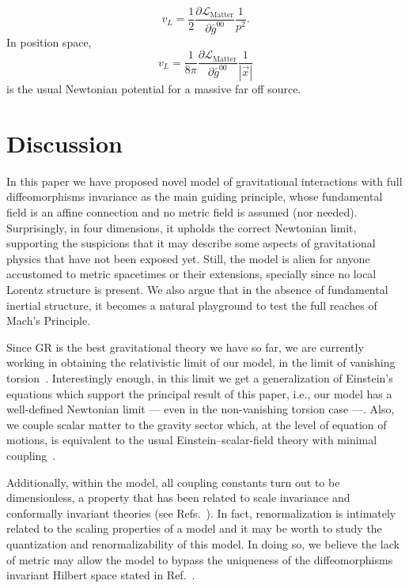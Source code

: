 \documentclass{ws-mpla}
\renewcommand{\(}{\left(}
\renewcommand{\)}{\right)}
\renewcommand{\[}{\left[}
\renewcommand{\]}{\right]}
\begin{document}
\begin{equation}
  v_L=\frac{1}{2}\frac{\partial\mathcal{L}_{\text{Matter}}}{\partial\bar{g}^{00}}\frac{1}{p^2}.
\end{equation}
In position space, 
\begin{equation}
  v_L = \frac{1}{8\pi} \frac{ \partial\mathcal{L}_{\text{Matter}} }{ \partial \bar{g}^{00} } \frac{1}{|\vec{x}|}
\end{equation}
is the usual Newtonian potential for a massive far off source.


\section{\label{sec:dis}Discussion}

In this paper we have proposed novel model of gravitational interactions with full diffeomorphisms invariance as the main guiding principle, whose fundamental field is an affine connection and no metric field is assumed (nor needed). Surprisingly, in four dimensions, it upholds the correct Newtonian limit, supporting the suspicions that it may describe some aspects of gravitational physics that have not been exposed yet. Still, the model is alien for anyone accustomed to metric spacetimes or their extensions, specially since no local Lorentz structure is present. We also argue that in the absence of fundamental inertial structure, it becomes a natural playground to test the full reaches of Mach's Principle.

Since GR is the best gravitational theory we have so far, we are currently working in obtaining the relativistic limit of our model, in the limit of vanishing torsion~\cite{OCF-future3}. Interestingly enough, in this limit we get a generalization of Einstein's equations which support the principal result of this paper, i.e., our model has a well-defined Newtonian limit --- even in the non-vanishing torsion case ---. Also, we couple scalar matter to the gravity sector which, at the level of equation of motions, is equivalent to the usual Einstein--scalar-field theory with minimal coupling~\cite{OCF-future3}.

Additionally, within the model, all coupling constants turn out to be dimensionless, a property that has been related to scale invariance and conformally invariant theories (see Refs.~\cite{Buchholz:1976hz,Maldacena:2011mk}). In fact, renormalization is intimately related to the scaling properties of a model and it may be worth to study the quantization and renormalizability of this  model. In doing so, we believe the lack of metric may allow the model to bypass the uniqueness of the diffeomorphisms invariant Hilbert space stated in Ref.~\cite{Lewandowski:2005jk}.
\end{document}
